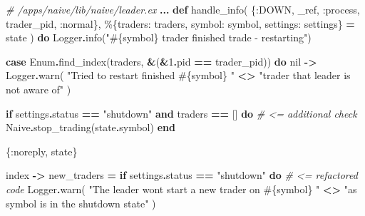 \documentclass[
  oneside]{book}
\newenvironment{Shaded}{\begin{snugshade}}{\end{snugshade}}
\newcommand{\CommentTok}[1]{\textcolor[rgb]{0.56,0.35,0.01}{\textit{#1}}}
\newcommand{\ConstantTok}[1]{\textcolor[rgb]{0.00,0.00,0.00}{#1}}
\newcommand{\ControlFlowTok}[1]{\textcolor[rgb]{0.13,0.29,0.53}{\textbf{#1}}}
\newcommand{\DecValTok}[1]{\textcolor[rgb]{0.00,0.00,0.81}{#1}}
\newcommand{\KeywordTok}[1]{\textcolor[rgb]{0.13,0.29,0.53}{\textbf{#1}}}
\newcommand{\NormalTok}[1]{#1}
\newcommand{\OperatorTok}[1]{\textcolor[rgb]{0.81,0.36,0.00}{\textbf{#1}}}
\newcommand{\OtherTok}[1]{\textcolor[rgb]{0.56,0.35,0.01}{#1}}
\newcommand{\StringTok}[1]{\textcolor[rgb]{0.31,0.60,0.02}{#1}}
\newcommand{\VariableTok}[1]{\textcolor[rgb]{0.00,0.00,0.00}{#1}}
\begin{document}
\begin{Shaded}
\begin{Highlighting}[]
\CommentTok{\# /apps/naive/lib/naive/leader.ex}
  \OperatorTok{...}
  \KeywordTok{def}\NormalTok{ handle\_info(}
\NormalTok{        \{}\VariableTok{:DOWN}\NormalTok{, \_ref, }\VariableTok{:process}\NormalTok{, trader\_pid, }\VariableTok{:normal}\NormalTok{\},}
\NormalTok{        \%\{}\VariableTok{traders:}\NormalTok{ traders, }\VariableTok{symbol:}\NormalTok{ symbol, }\VariableTok{settings:}\NormalTok{ settings\} }\OperatorTok{=}\NormalTok{ state}
\NormalTok{      ) }\KeywordTok{do}
    \ConstantTok{Logger}\OperatorTok{.}\NormalTok{info(}\StringTok{"}\OtherTok{\#\{}\NormalTok{symbol}\OtherTok{\}}\StringTok{ trader finished trade {-} restarting"}\NormalTok{)}

    \KeywordTok{case} \ConstantTok{Enum}\OperatorTok{.}\NormalTok{find\_index(traders, }\OperatorTok{\&}\NormalTok{(}\OperatorTok{\&}\DecValTok{1}\OperatorTok{.}\NormalTok{pid }\OperatorTok{==}\NormalTok{ trader\_pid)) }\KeywordTok{do}
      \ConstantTok{nil} \OperatorTok{{-}\textgreater{}}
        \ConstantTok{Logger}\OperatorTok{.}\NormalTok{warn(}
          \StringTok{"Tried to restart finished }\OtherTok{\#\{}\NormalTok{symbol}\OtherTok{\}}\StringTok{ "} \OperatorTok{\textless{}\textgreater{}}
            \StringTok{"trader that leader is not aware of"}
\NormalTok{        )}

        \ControlFlowTok{if}\NormalTok{ settings}\OperatorTok{.}\NormalTok{status }\OperatorTok{==} \StringTok{"shutdown"} \KeywordTok{and}\NormalTok{ traders }\OperatorTok{==}\NormalTok{ [] }\KeywordTok{do} \CommentTok{\# \textless{}= additional check}
          \ConstantTok{Naive}\OperatorTok{.}\NormalTok{stop\_trading(state}\OperatorTok{.}\NormalTok{symbol)}
        \KeywordTok{end}

\NormalTok{        \{}\VariableTok{:noreply}\NormalTok{, state\}}

\NormalTok{      index }\OperatorTok{{-}\textgreater{}}
\NormalTok{        new\_traders }\OperatorTok{=}
          \ControlFlowTok{if}\NormalTok{ settings}\OperatorTok{.}\NormalTok{status }\OperatorTok{==} \StringTok{"shutdown"} \KeywordTok{do} \CommentTok{\# \textless{}= refactored code}
            \ConstantTok{Logger}\OperatorTok{.}\NormalTok{warn(}
              \StringTok{"The leader won\textquotesingle{}t start a new trader on }\OtherTok{\#\{}\NormalTok{symbol}\OtherTok{\}}\StringTok{ "} \OperatorTok{\textless{}\textgreater{}}
                \StringTok{"as symbol is in the \textquotesingle{}shutdown\textquotesingle{} state"}
\NormalTok{            )}
            

\end{Highlighting}
\end{Shaded}
\end{document}
